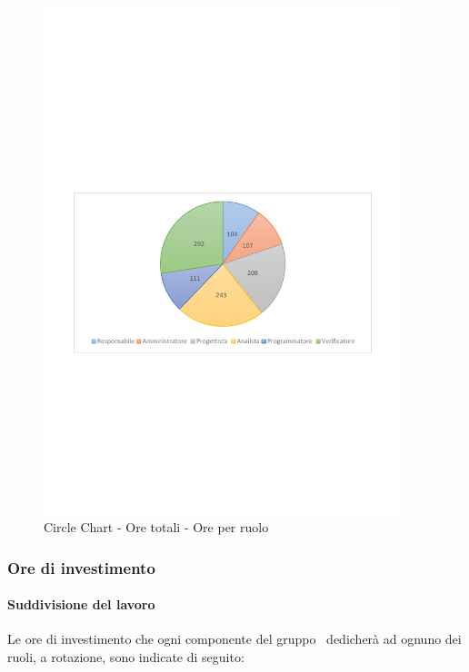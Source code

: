 \documentclass[../PianoProgetto.tex]{subfiles}
\begin{document}
	\begin{figure}[!h]
		\centering
		\includegraphics[width=0.93\textwidth , trim=2cm 9.5cm 2cm 11cm]{grafici/Riepilogo/Totali/ore-ruolo}
			\caption{Circle Chart - Ore totali - Ore per ruolo}
		\label{fig:CircleChart-totale_ore_r}
	\end{figure}	
\vfill
\newpage
	
	\subsubsection{Ore di investimento}
				\paragraph{Suddivisione del lavoro}
					Le ore di investimento che ogni componente del gruppo \leaf\ dedicherà ad ognuno dei ruoli, a rotazione, sono indicate di seguito:
	
\end{document}
